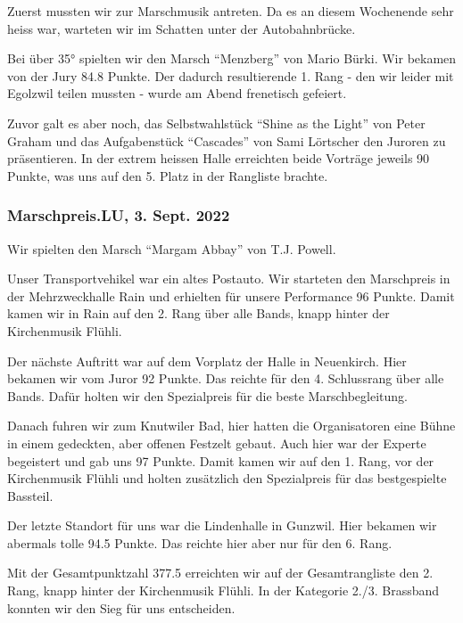 \begin{history}
    Zuerst mussten wir zur Marschmusik antreten. Da es an diesem Wochenende sehr
    heiss war, warteten wir im Schatten unter der Autobahnbrücke.

    Bei über 35° spielten wir den Marsch \enquote{Menzberg} von Mario Bürki. Wir
    bekamen von der Jury 84.8 Punkte. Der dadurch resultierende 1. Rang - den
    wir leider mit Egolzwil teilen mussten - wurde am Abend frenetisch gefeiert.

    Zuvor galt es aber noch, das Selbstwahlstück \enquote{Shine as the Light}
    von Peter Graham und das Aufgabenstück \enquote{Cascades} von
    Sami Lörtscher den Juroren zu präsentieren. In der extrem heissen Halle
    erreichten beide Vorträge jeweils 90 Punkte, was uns auf den 5. Platz in der
    Rangliste brachte.

    \subsubsection*{Marschpreis.LU, 3. Sept. 2022}

    Wir spielten den Marsch \enquote{Margam Abbay} von T.J. Powell.

    Unser Transportvehikel war ein altes Postauto. Wir starteten den Marschpreis
    in der Mehrzweckhalle Rain und erhielten für unsere Performance 96 Punkte.
    Damit kamen wir in Rain auf den 2. Rang über alle Bands, knapp hinter der
    Kirchenmusik Flühli.

    Der nächste Auftritt war auf dem Vorplatz der Halle in Neuenkirch. Hier
    bekamen wir vom Juror 92 Punkte. Das reichte für den 4. Schlussrang über
    alle Bands. Dafür holten wir den Spezialpreis für die beste
    Marschbegleitung.

    Danach fuhren wir zum Knutwiler Bad, hier hatten die Organisatoren eine
    Bühne in einem gedeckten, aber offenen Festzelt gebaut. Auch hier war der
    Experte begeistert und gab uns 97 Punkte. Damit kamen wir auf den 1. Rang,
    vor der Kirchenmusik Flühli und holten zusätzlich den Spezialpreis für das
    bestgespielte Bassteil.

    Der letzte Standort für uns war die Lindenhalle in Gunzwil. Hier bekamen wir
    abermals tolle 94.5 Punkte. Das reichte hier aber nur für den 6. Rang.

    Mit der Gesamtpunktzahl 377.5 erreichten wir auf der Gesamtrangliste den 2.
    Rang, knapp hinter der Kirchenmusik Flühli. In der Kategorie 2./3. Brassband
    konnten wir den Sieg für uns entscheiden.



\end{history}
